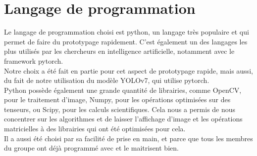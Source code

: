 \section{Langage de programmation}
Le langage de programmation choisi est python, un langage très populaire et qui permet de faire du prototypage rapidement. C'est également un des langages les plus utilisés par les chercheurs en intelligence artificielle, notamment avec le framework pytorch.\\
Notre choix a été fait en partie pour cet aspect de prototypage rapide, mais aussi, du fait de notre utilisation du modèle YOLOv7\cite{wang_yolov7_nodate}, qui utilise pytorch.\\
Python possède également une grande quantité de librairies, comme OpenCV, pour le traitement d'image, Numpy, pour les opérations optimisées sur des tenseurs, ou Scipy, pour les calculs scientifiques. Cela nous a permis de nous concentrer sur les algorithmes et de laisser l'affichage d'image et les opérations matricielles à des librairies qui ont été optimisées pour cela.\\
Il a aussi été choisi par sa facilité de prise en main, et parce que tous les membres du groupe ont déjà programmé avec et le maitrisent bien.


\clearpage
